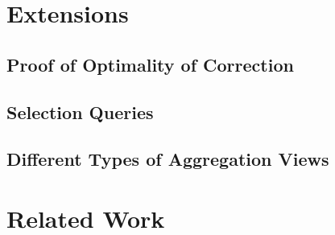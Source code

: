 \section{Extensions}

\subsection{Proof of Optimality of Correction}

\subsection{Selection Queries}

\subsection{Different Types of Aggregation Views}


\section{Related Work}
